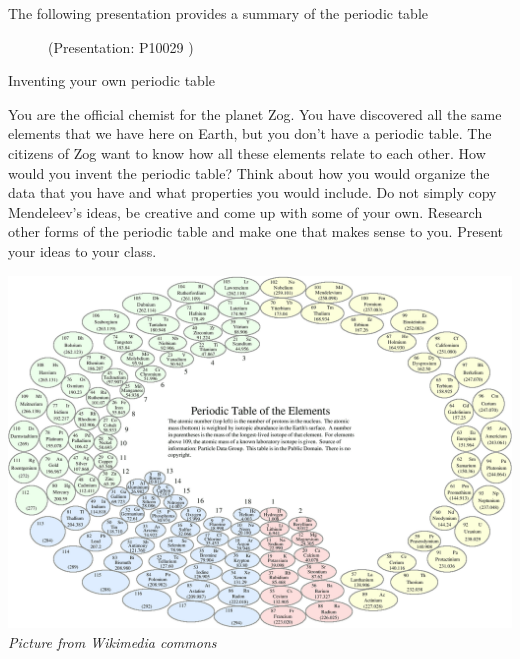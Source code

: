 The following presentation provides a summary of the periodic table
    \setcounter{subfigure}{0}
	\begin{figure}[H] %
    \label{m38757*slidesharemedia}\label{m38757*slideshareflash} { (Presentation:  P10029 )}
      \vspace{2pt}
    \vspace{.1in}
 \end{figure}       \par 
    \label{m38757*eip-572}

\begin{activity}{Inventing your own periodic table}
            \nopagebreak
            \label{m38760*eip-603}
\begin{minipage}{.5\textwidth}
You are the official chemist for the planet Zog. You have discovered all the same elements that we have here on Earth, but you don't have a periodic table. The citizens of Zog want to know how all these elements relate to each other. How would you invent the periodic table? Think about how you would organize the data that you have and what properties you would include. Do not simply copy Mendeleev's ideas, be creative and come up with some of your own. Research other forms of the periodic table and make one that makes sense to you. Present your ideas to your class. 
\end{minipage}
\begin{minipage}{.5\textwidth}
\begin{center}
\includegraphics[width=.8\textwidth]{photos/Circular_periodic_table.png}\\
\textsl{Picture from Wikimedia commons}
\end{center}
\end{minipage}

\end{activity}

